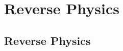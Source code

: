 \documentclass[11pt,letterpaper,fleqn]{memoir}
\begin{document}
\part*{Reverse Physics}

\tableofcontents* 

\cleardoublepage 
\mainmatter

\chapter{Reverse Physics}





	
\end{document}

